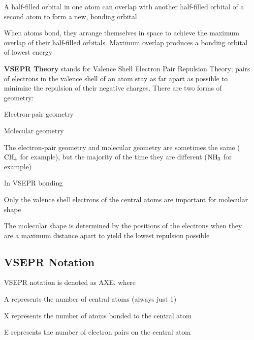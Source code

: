 \begin{bulleted-list}
    \item A half-filled orbital in one atom can overlap with another half-filled orbital of a
        second atom to form a new, bonding orbital
    \item When atoms bond, they arrange themselves in space to achieve the maximum overlap 
        of their half-filled orbitals. Maximum overlap produces a bonding orbital of lowest energy
\end{bulleted-list}

\textbf{VSEPR Theory} stands for Valence Shell Electron Pair Repulsion Theory; pairs of electrons
in the valence shell of an atom stay as far apart as possible to minimize the repulsion of their
negative charges. There are two forms of geometry:
\begin{enum}
    \item Electron-pair geometry
    \item Molecular geometry
\end{enum}
The electron-pair geometry and molecular geometry are sometimes the same ($\ch{CH4}$ for example),
but the majority of the time they are different ($\ch{NH3}$ for example)

\begin{important}
    In VSEPR bonding
    \begin{bulleted-list}
        \item Only the valence shell electrons of the central atoms are important for molecular
            shape
        \item The molecular shape is determined by the positions of the electrons when they are a 
            maximum distance apart to yield the lowest repulsion possible
    \end{bulleted-list}
\end{important}

\subsection{VSEPR Notation}
VSEPR notation is denoted as AXE, where
\begin{bulleted-list}
    \item A represents the number of central atoms (always just 1)
    \item X represents the number of atoms bonded to the central atom
    \item E represents the number of electron pairs on the central atom
\end{bulleted-list}
